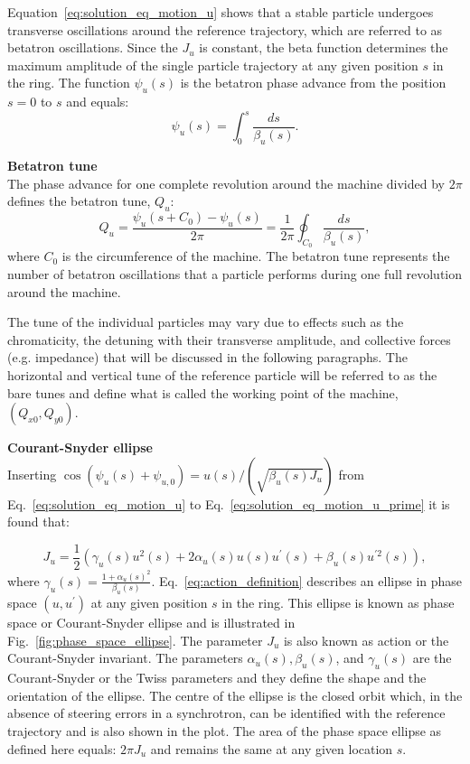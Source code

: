 Equation~\eqref{eq:solution_eq_motion_u} shows that a stable particle undergoes transverse oscillations around the reference trajectory, which are referred to as betatron oscillations. Since the $J_u$ is constant, the beta function determines the maximum amplitude of the single particle trajectory at any given position $s$ in the ring.
The function $\psi_u(s)$ is the betatron phase advance from the position $s=0$ to $s$ and equals:
\begin{equation}\label{eq:phase_advance_definition_with_twiss}
    \psi_u(s)= \int_{0}^{s} \frac{ds}{\beta_u(s)}.
\end{equation}

\textbf{Betatron tune}\\
The phase advance for one complete revolution around the machine divided by $2\pi$ defines the betatron tune, $Q_u$:
\begin{equation}\label{eq:betatron_tune}
    Q_u = \frac{\psi_u(s+C_0)-\psi_u(s)}{2\pi} = \frac{1}{2\pi} \oint_{C_0} \frac{ds}{\beta_u(s)},
\end{equation}
where $C_0$ is the circumference of the machine. The betatron tune represents the number of betatron oscillations that a particle performs during one full revolution around the machine.

The tune of the individual particles may vary due to effects such as the chromaticity, the detuning with their transverse amplitude, and collective forces (e.g. impedance) that will be discussed in the following paragraphs. The horizontal and vertical tune of the reference particle will be referred to as the bare tunes and define what is called the working point of the machine, $(Q_{x0}, Q_{y0})$. 

\textbf{Courant-Snyder ellipse}\\
Inserting $\cos{(\psi_u(s)+ \psi_{u,0})} = u(s)/(\sqrt{\beta_u(s) J_u})$ from Eq.~\eqref{eq:solution_eq_motion_u} to Eq.~\eqref{eq:solution_eq_motion_u_prime} it is found that:

\begin{equation}\label{eq:action_definition}
    J_u = \frac{1}{2} (\gamma_u(s) u^2(s) + 2 \alpha_u(s) u(s) u^\prime(s) + \beta_u(s) u^{\prime 2}(s)),
\end{equation}
where $\gamma_u(s)=\frac{1+\alpha_u(s)^2}{\beta_u(s)}$. Eq.~\eqref{eq:action_definition} describes an ellipse in phase space $(u, u^\prime)$ at any given position $s$ in the ring. This ellipse is known as phase space or Courant-Snyder ellipse and is illustrated in Fig.~\ref{fig:phase_space_ellipse}. The parameter $J_u$ is also known as action or the Courant-Snyder invariant. The parameters $\alpha_u(s), \beta_u(s)$, and $\gamma_u(s)$ are the Courant-Snyder or the Twiss parameters and they define the shape and the orientation of the ellipse. The centre of the ellipse is the closed orbit which, in the absence of steering errors in a synchrotron, can be identified with the reference trajectory and is also shown in the plot. The area of the phase space ellipse as defined here equals: $2\pi J_u$ and remains the same at any given location $s$.

